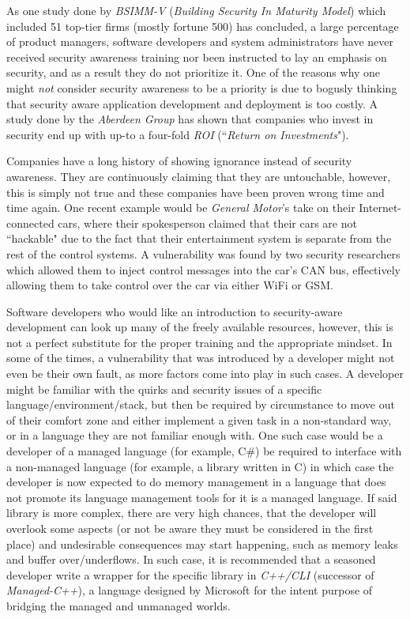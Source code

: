 \documentclass[a4paper,12pt]{article}
\begin{document}
	As one study done by \textit{BSIMM-V} (\textit{Building Security In Maturity Model}) which included 51 top-tier firms (mostly fortune 500) has concluded\cite{gmcgraw12}, a large percentage of product managers, software developers and system administrators have never received security awareness training nor been instructed to lay an emphasis on security, and as a result they do not prioritize it. One of the reasons why one might \textit{not} consider security awareness to be a priority is due to bogusly thinking that security aware application development and deployment is too costly. A study done by the \textit{Aberdeen Group} has shown that companies who invest in security end up with up-to a four-fold \textit{ROI} (``\textit{Return on Investments}").\cite{aberdeen11}
	
	Companies have a long history of showing ignorance instead of security awareness. They are continuously claiming that they are untouchable, however, this is simply not true and these companies have been proven wrong time and time again. One recent example would be \textit{General Motor}'s take on their Internet-connected cars, where their spokesperson claimed that their cars are not ``hackable" due to the fact that their entertainment system is separate from the rest of the control systems. A vulnerability was found by two security researchers\cite{cmiller15} which allowed them to inject control messages into the car's CAN bus, effectively allowing them to take control over the car via either WiFi or GSM.
	
	Software developers who would like an introduction to security-aware development can look up many of the freely available resources, however, this is not a perfect substitute for the proper training and the appropriate mindset. In some of the times, a vulnerability that was introduced by a developer might not even be their own fault, as more factors come into play in such cases. A developer might be familiar with the quirks and security issues of a specific language/environment/stack, but then be required by circumstance to move out of their comfort zone and either implement a given task in a non-standard way, or in a language they are not familiar enough with. One such case would be a developer of a managed language (for example, C\#) be required to interface with a non-managed language (for example, a library written in C) in which case the developer is now expected to do memory management in a language that does not promote its language management tools for it is a managed language. If said library is more complex, there are very high chances, that the developer will overlook some aspects (or not be aware they must be considered in the first place) and undesirable consequences may start happening, such as memory leaks and buffer over/underflows. In such case, it is recommended that a seasoned developer write a wrapper for the specific library in \textit{C++/CLI} (successor of \textit{Managed-C++}), a language designed by Microsoft for the intent purpose\cite{hstutter06} of bridging the managed and unmanaged worlds.
	
\end{document}
